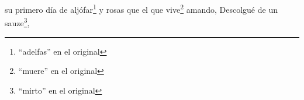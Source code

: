 su primero día de aljófar\footnote{\textsuperscript{}``adelfas'' en el original} y rosas
que el que vive\footnote{\textsuperscript{}``muere'' en el original} amando,
Descolgué de un sauze\footnote{\textsuperscript{}``mirto'' en el original},

